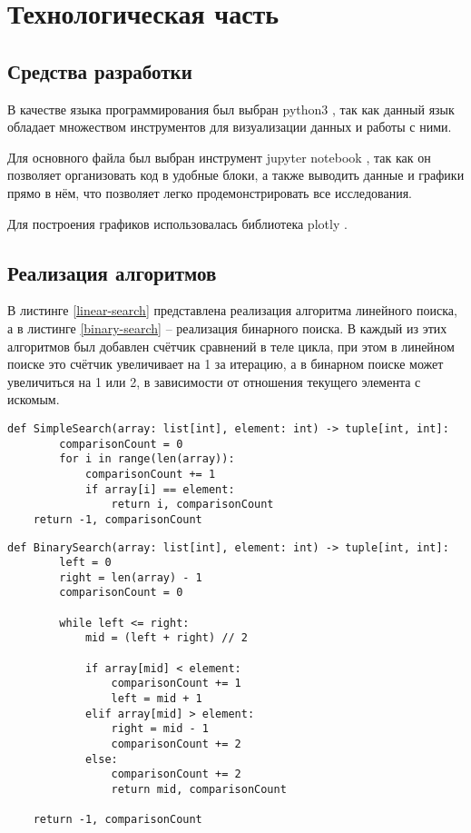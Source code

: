 \chapter{Технологическая часть}
\section{Средства разработки}

В качестве языка программирования был выбран python3 \cite{python3}, так как данный язык обладает множеством инструментов для визуализации данных и работы с ними.

Для основного файла был выбран инструмент jupyter notebook \cite{python3-jupyter}, так как он позволяет организовать код в удобные блоки,  а также выводить данные и графики прямо в нём, что позволяет легко продемонстрировать все исследования.

Для построения графиков использовалась библиотека plotly \cite{python3-plotly}.

\section{Реализация алгоритмов}

В листинге \ref{linear-search} представлена реализация алгоритма линейного поиска, а в листинге \ref{binary-search} – реализация бинарного поиска. В каждый из этих алгоритмов был добавлен счётчик сравнений в теле цикла, при этом в линейном поиске это счётчик увеличивает на 1 за итерацию, а в бинарном поиске может увеличиться на 1 или 2, в зависимости от отношения текущего элемента с искомым.

\begin{lstlisting}[label=linear-search,caption={Алгоритм линейного поиска}]
	def SimpleSearch(array: list[int], element: int) -> tuple[int, int]:
		comparisonCount = 0
		for i in range(len(array)):
			comparisonCount += 1
			if array[i] == element:
				return i, comparisonCount
	return -1, comparisonCount
\end{lstlisting}

\begin{lstlisting}[label=binary-search,caption={Алгоритм бинарного поиска}]
	def BinarySearch(array: list[int], element: int) -> tuple[int, int]:
		left = 0
		right = len(array) - 1
		comparisonCount = 0
	
		while left <= right:
			mid = (left + right) // 2
	
			if array[mid] < element:
				comparisonCount += 1
				left = mid + 1
			elif array[mid] > element:
				right = mid - 1
				comparisonCount += 2
			else:
				comparisonCount += 2
				return mid, comparisonCount
	
	return -1, comparisonCount
\end{lstlisting}

